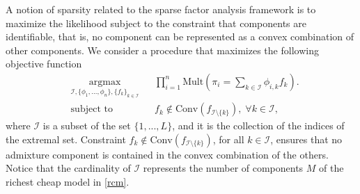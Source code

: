 \documentclass[12pt, reqno]{amsart}
\theoremstyle{definition}
\begin{document}
A notion of sparsity related to the sparse factor analysis framework is to maximize the likelihood subject to the constraint that components are identifiable, that is, no component can be represented as a convex combination of other components. We consider a procedure that maximizes the following objective function
\begin{equation} \label{opt_probl}
\begin{aligned}
& \underset{ \mathcal{I},\{\phi_1,...,\phi_n\}, \{f_k\}_{k \in \mathcal{I}}} {\text{argmax} }
& &   \prod_{i=1}^n \mbox{Mult}\left(\pi_i =  \sum_{k \in \mathcal{I}} \phi_{i,k} f_k  \right). \\
& \text{subject to}
& & f_k \not \in \mbox{Conv}(f_{\mathcal{I} \setminus \{k\}}) , \; \forall k \in \mathcal{I} ,
\end{aligned}
\end{equation}
where $\mathcal{I}$ is a subset of the set $\{1,...,L\}$, and it is the collection of the indices of the extremal set. Constraint  $f_k \not \in \mbox{Conv}(f_{\mathcal{I} \setminus \{k\}})$, for all $k \in \mathcal{I}$, ensures that no admixture component is contained in the convex combination of the others. Notice that the cardinality of $\mathcal{I}$ represents the number of components $M$ of the richest cheap model in \eqref{rcm}.
\end{document}
